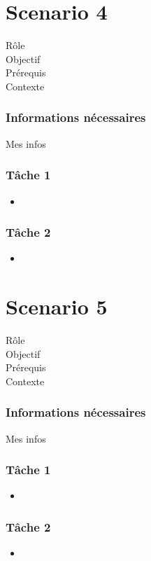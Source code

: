 \documentclass{EPL-master-thesis-covers-FR}
\begin{document}
			\section{Scenario 4}
				\begin{description}
					\item[Rôle]
					\item[Objectif]
					\item[Prérequis]
					\item[Contexte]
				\end{description}
							
				\subsubsection*{Informations nécessaires}
					Mes infos
					
				\subsubsection*{Tâche 1}
					\begin{itemize}
						\item 
					\end{itemize}
					
				\subsubsection*{Tâche 2}
					\begin{itemize}
						\item 
					\end{itemize}
			
			\section{Scenario 5}
				\begin{description}
					\item[Rôle]
					\item[Objectif]
					\item[Prérequis]
					\item[Contexte]
				\end{description}
							
				\subsubsection*{Informations nécessaires}
					Mes infos
					
				\subsubsection*{Tâche 1}
					\begin{itemize}
						\item 
					\end{itemize}
					
				\subsubsection*{Tâche 2}
					\begin{itemize}
						\item 
					\end{itemize}
			

	

	\setlength{\parskip}{0em}
	\backcoverpage
\end{document}
